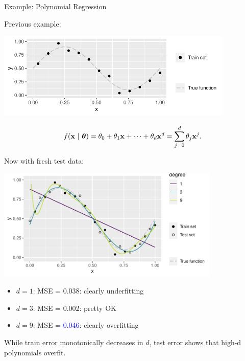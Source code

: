 \documentclass[11pt,compress,t,notes=noshow, xcolor=table]{beamer}
\begin{document}
\begin{vbframe}{Example: Polynomial Regression}

Previous example:

\vfill

\begin{center}
  \includegraphics[width=0.85\textwidth]{figure/eval_train_1}
\end{center}

\[ f(\mathbf{x} ~|~ \bm{\theta}) = \theta_0 + \theta_1 \mathbf{x} + \cdots + \theta_d \mathbf{x}^d = \sum_{j = 0}^{d}
\theta_j \mathbf{x}^j\text. \]

\framebreak

Now with fresh test data:

\includegraphics[width=0.8\textwidth]{figure/eval_test_2} 

\begin{itemize}
  \footnotesize
  \item $d = 1$: MSE = 0.038: clearly underfitting
  \item $d = 3$: MSE = 0.002: pretty OK
  \item $d = 9$: MSE = \textcolor{blue}{0.046}: clearly overfitting
\end{itemize}

\vfill

While train error monotonically decreases in $d$, 
test error shows that high-d polynomials overfit.

\end{vbframe}
\end{document}

